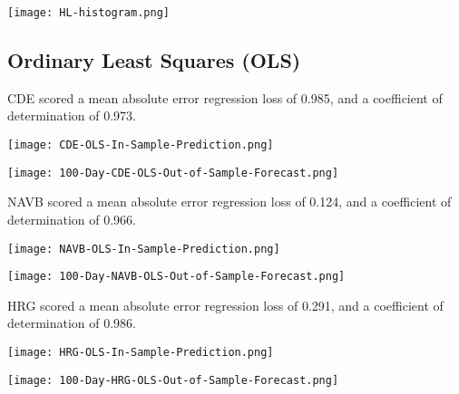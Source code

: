 \begin{center}  
    \texttt{[image: HL-histogram.png]}
    \label{fig:nonfloat}
\end{center}

\subsection{Ordinary Least Squares (OLS)}

CDE scored a mean absolute error regression loss of 0.985, and a coefficient of determination of 0.973.

\begin{center}
    \texttt{[image: CDE-OLS-In-Sample-Prediction.png]}
    \label{fig:nonfloat}
\end{center}

\begin{center}
    \texttt{[image: 100-Day-CDE-OLS-Out-of-Sample-Forecast.png]}
    \label{fig:nonfloat}
\end{center}

NAVB scored a mean absolute error regression loss of 0.124, and a coefficient of determination of 0.966.

\begin{center}  
    \texttt{[image: NAVB-OLS-In-Sample-Prediction.png]}
    \label{fig:nonfloat}
\end{center}

\begin{center}
  
    \texttt{[image: 100-Day-NAVB-OLS-Out-of-Sample-Forecast.png]}
    \label{fig:nonfloat}
\end{center}

HRG scored a mean absolute error regression loss of 0.291, and a coefficient of determination of 0.986.

\begin{center}  
    \texttt{[image: HRG-OLS-In-Sample-Prediction.png]}
    \label{fig:nonfloat}
\end{center}

\begin{center}
    \texttt{[image: 100-Day-HRG-OLS-Out-of-Sample-Forecast.png]}
    \label{fig:nonfloat}
\end{center}

